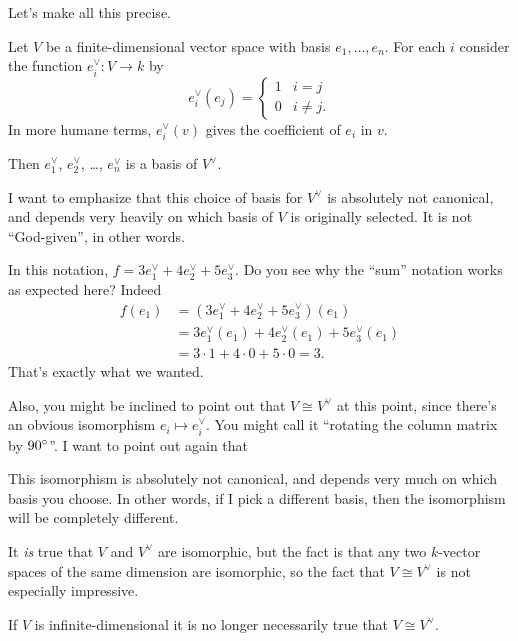 Let's make all this precise.
\begin{proposition}
	Let $V$ be a finite-dimensional vector space with basis $e_1, \dots, e_n$.
	For each $i$ consider the function $e_i^\vee : V \to k$ by
	\[
		e_i^\vee(e_j)
		= \begin{cases}
			1 & i=j \\
			0 & i \neq j.
		\end{cases}
	\]
	In more humane terms, $e_i^\vee(v)$ gives the coefficient of $e_i$ in $v$.

	Then $e_1^\vee$, $e_2^\vee$, \dots, $e_n^\vee$ is a basis of $V^\vee$.
\end{proposition}
I want to emphasize that this choice of basis for $V^\vee$ is absolutely not canonical, and depends very heavily on which basis of $V$ is originally selected.
It is not ``God-given'', in other words.

\begin{example}
	In this notation, $f = 3e_1^\vee + 4e_2^\vee + 5e_3^\vee$.
	Do you see why the ``sum'' notation works as expected here?
	Indeed
	\begin{align*}
		f(e_1) &= (3e_1^\vee + 4e_2^\vee + 5e_3^\vee)(e_1) \\
		&= 3e_1^\vee(e_1) + 4e_2^\vee(e_1) + 5e_3^\vee(e_1) \\
		&= 3 \cdot 1 + 4 \cdot 0 + 5 \cdot 0 = 3.
	\end{align*}
	That's exactly what we wanted.
\end{example}

Also, you might be inclined to point out that $V \cong V^\vee$ at this point,
since there's an obvious isomorphism $e_i \mapsto e_i^\vee$.
You might call it ``rotating the column matrix by $90^\circ$''.
I want to point out again that
\begin{itemize}
	\ii This isomorphism is absolutely not canonical,
	and depends very much on which basis you choose.
	In other words, if I pick a different basis, then the isomorphism
	will be completely different.

	It \emph{is} true that $V$ and $V^\vee$ are isomorphic,
	but the fact is that any two $k$-vector spaces of the same dimension are isomorphic,
	so the fact that $V \cong V^\vee$ is not especially impressive.
	
	\ii If $V$ is infinite-dimensional it is no longer necessarily true that $V \cong V^\vee$.
\end{itemize}

